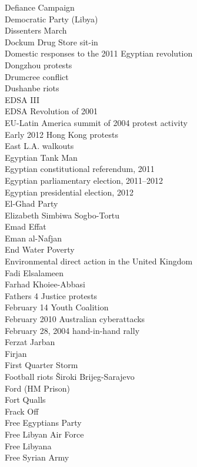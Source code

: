 Defiance Campaign\\
Democratic Party (Libya)\\
Dissenters March\\
Dockum Drug Store sit-in\\
Domestic responses to the 2011 Egyptian revolution\\
Dongzhou protests\\
Drumcree conflict\\
Dushanbe riots\\
EDSA III\\
EDSA Revolution of 2001\\
EU-Latin America summit of 2004 protest activity\\
Early 2012 Hong Kong protests\\
East L.A. walkouts\\
Egyptian Tank Man\\
Egyptian constitutional referendum, 2011\\
Egyptian parliamentary election, 2011–2012\\
Egyptian presidential election, 2012\\
El-Ghad Party\\
Elizabeth Simbiwa Sogbo-Tortu\\
Emad Effat\\
Eman al-Nafjan\\
End Water Poverty\\
Environmental direct action in the United Kingdom\\
Fadi Elsalameen\\
Farhad Khoiee-Abbasi\\
Fathers 4 Justice protests\\
February 14 Youth Coalition\\
February 2010 Australian cyberattacks\\
February 28, 2004 hand-in-hand rally\\
Ferzat Jarban\\
Firjan\\
First Quarter Storm\\
Football riots Široki Brijeg-Sarajevo\\
Ford (HM Prison)\\
Fort Qualls\\
Frack Off\\
Free Egyptians Party\\
Free Libyan Air Force\\
Free Libyana\\
Free Syrian Army\\
